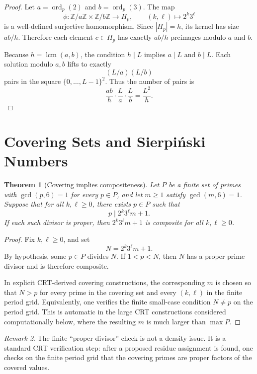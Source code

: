 \documentclass[11pt]{article}
\newtheorem{theorem}{Theorem}[section]
\theoremstyle{definition}
\theoremstyle{remark}
\newtheorem{remark}[theorem]{Remark}
\DeclareMathOperator{\ord}{ord}
\DeclareMathOperator{\lcm}{lcm}
\begin{document}
\begin{proof}
Let \(a=\ord_p(2)\) and \(b=\ord_p(3)\).  The map
\[
        \phi:\mathbb Z/a\mathbb Z\times \mathbb Z/b\mathbb Z\to H_p,
        \qquad
        (k,\ell)\mapsto 2^k3^\ell
\]
is a well-defined surjective homomorphism.  Since \(|H_p|=h\), its kernel has
size \(ab/h\).  Therefore each element \(c\in H_p\) has exactly \(ab/h\)
preimages modulo \(a\) and \(b\).

Because \(h=\lcm(a,b)\), the condition \(h\mid L\) implies \(a\mid L\) and
\(b\mid L\).  Each solution modulo \(a,b\) lifts to exactly
\[
        (L/a)(L/b)
\]
pairs in the square \(\{0,\ldots,L-1\}^2\).  Thus the number of pairs is
\[
        \frac{ab}{h}\cdot \frac La\cdot\frac Lb=\frac{L^2}{h}.
\]
\end{proof}

\section{Covering Sets and Sierpi\'nski Numbers}

\begin{theorem}[Covering implies compositeness]
Let \(P\) be a finite set of primes with \(\gcd(p,6)=1\) for every
\(p\in P\), and let \(m\geq 1\) satisfy \(\gcd(m,6)=1\).  Suppose that for all
\(k,\ell\geq 0\), there exists \(p\in P\) such that
\[
        p\mid 2^k3^\ell m+1.
\]
If each such divisor is proper, then \(2^k3^\ell m+1\) is composite for all
\(k,\ell\geq 0\).
\end{theorem}

\begin{proof}
Fix \(k,\ell\geq 0\), and set
\[
        N=2^k3^\ell m+1.
\]
By hypothesis, some \(p\in P\) divides \(N\).  If \(1<p<N\), then \(N\) has a
proper prime divisor and is therefore composite.

In explicit CRT-derived covering constructions, the corresponding \(m\) is
chosen so that \(N>p\) for every prime in the covering set and every
\((k,\ell)\) in the finite period grid.  Equivalently, one verifies the finite
small-case condition \(N\neq p\) on the period grid.  This is automatic in the
large CRT constructions considered computationally below, where the resulting
\(m\) is much larger than \(\max P\).
\end{proof}

\begin{remark}
The finite ``proper divisor'' check is not a density issue.  It is a standard
CRT verification step: after a proposed residue assignment is found, one checks
on the finite period grid that the covering primes are proper factors of the
covered values.
\end{remark}
\end{document}
